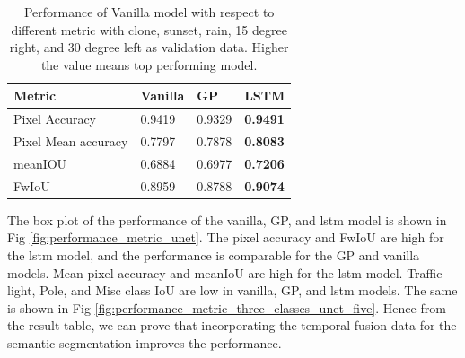 	\begin{table}
		\begin{center}
			\begin{tabular}{ | l | p{4cm} | p{4cm} | p{4cm} |}
				\hline
				
				\cellcolor{purple!30}Metric & \cellcolor{purple!30}Vanilla & \cellcolor{purple!30}GP & \cellcolor{purple!30}LSTM\\ \hline
				Pixel Accuracy & 0.9419 & 0.9329 & {\bf 0.9491} \\ \hline
				Pixel Mean accuracy & 0.7797 & 0.7878 & {\bf 0.8083}  \\ \hline
				meanIOU & 0.6884 & 0.6977 & {\bf 0.7206} \\ \hline
				FwIoU & 0.8959 & 0.8788 & {\bf 0.9074} \\ \hline
				\hline
			\end{tabular}
			\caption{Performance of Vanilla model with respect to different metric with clone, sunset, rain, 15 degree right, and 30 degree left as validation data. Higher the value means top performing model.}
			\label{table:Vanilla_conti_seq}
		\end{center}
	\end{table}
	
	The box plot of the performance of the vanilla, GP, and lstm model is shown in Fig \ref{fig:performance_metric_unet}. The pixel accuracy and  FwIoU are high for the lstm model, and the performance is comparable for the GP and vanilla models. Mean pixel accuracy and meanIoU are high for the lstm model. Traffic light, Pole, and Misc class IoU are low in vanilla, GP, and lstm models. The same is shown in Fig \ref{fig:performance_metric_three_classes_unet_five}. Hence from the result table, we can prove that incorporating the temporal fusion data for the semantic segmentation improves the performance. 

